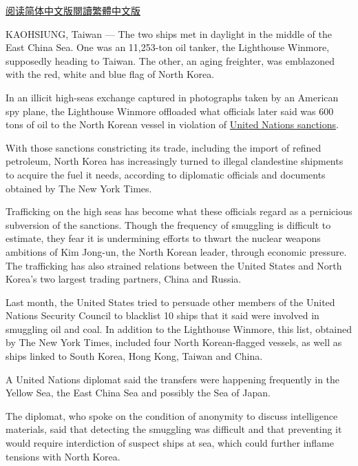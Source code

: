 \href{https://cn.nytimes3xbfgragh.onion/china/20180119/north-korea-oil-smuggling/}{阅读简体中文版}\href{https://cn.nytimes3xbfgragh.onion/china/20180119/north-korea-oil-smuggling/zh-hant/}{閱讀繁體中文版}

KAOHSIUNG, Taiwan --- The two ships met in daylight in the middle of the
East China Sea. One was an 11,253-ton oil tanker, the Lighthouse
Winmore, supposedly heading to Taiwan. The other, an aging freighter,
was emblazoned with the red, white and blue flag of North Korea.

In an illicit high-seas exchange captured in photographs taken by an
American spy plane, the Lighthouse Winmore offloaded what officials
later said was 600 tons of oil to the North Korean vessel in violation
of
\href{https://www.nytimes3xbfgragh.onion/2017/12/22/world/asia/north-korea-security-council-nuclear-missile-sanctions.html}{United
Nations sanctions}.

With those sanctions constricting its trade, including the import of
refined petroleum, North Korea has increasingly turned to illegal
clandestine shipments to acquire the fuel it needs, according to
diplomatic officials and documents obtained by The New York Times.

Trafficking on the high seas has become what these officials regard as a
pernicious subversion of the sanctions. Though the frequency of
smuggling is difficult to estimate, they fear it is undermining efforts
to thwart the nuclear weapons ambitions of Kim Jong-un, the North Korean
leader, through economic pressure. The trafficking has also strained
relations between the United States and North Korea's two largest
trading partners, China and Russia.

Last month, the United States tried to persuade other members of the
United Nations Security Council to blacklist 10 ships that it said were
involved in smuggling oil and coal. In addition to the Lighthouse
Winmore, this list, obtained by The New York Times, included four North
Korean-flagged vessels, as well as ships linked to South Korea, Hong
Kong, Taiwan and China.

A United Nations diplomat said the transfers were happening frequently
in the Yellow Sea, the East China Sea and possibly the Sea of Japan.

The diplomat, who spoke on the condition of anonymity to discuss
intelligence materials, said that detecting the smuggling was difficult
and that preventing it would require interdiction of suspect ships at
sea, which could further inflame tensions with North Korea.

